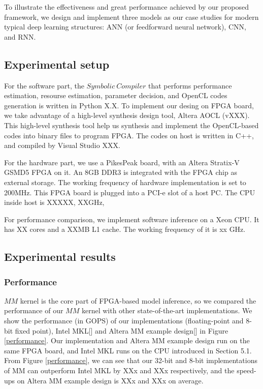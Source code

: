 \documentclass{acm_proc_article-sp-copy}
\begin{document}
To illustrate the effectiveness and great performance achieved by our proposed framework, we design and implement three models as our case studies for modern typical deep learning structures: ANN (or feedforward neural network), CNN, and RNN. 


\subsection{Experimental setup}
For the software part, the $Symbolic\ Compiler$ that performs performance estimation, resourse estimation, parameter decision, and OpenCL codes generation is written in Python X.X. To implement our desing on FPGA board, we take advantage of a high-level synthesis design tool, Altera AOCL (vXXX). This high-level synthesis tool help us synthesis and implement the OpenCL-based codes into binary files to program FPGA. The codes on host is written in C++, and compiled by Visual Studio XXX.

For the hardware part, we use a PikesPeak board, with an Altera Stratix-V GSMD5 FPGA on it. An 8GB DDR3 is integrated with the FPGA chip as external storage. The working  frequency of hardware implementation is set to 200MHz. This FPGA board is plugged into a PCI-e slot of a host PC. The CPU inside host is XXXXX, XXGHz,

For performance comparison, we implement software inference on a Xeon CPU. It has XX cores and a XXMB L1 cache. The working frequency of it is xx GHz.

\subsection{Experimental results}

\subsubsection{Performance}
$MM$ kernel is the core part of FPGA-based model inference, so we compared the performance of our $MM$ kernel with other state-of-the-art implementations. We show the performance (in GOPS) of our implementations (floating-point and 8-bit fixed point), Intel MKL[] and Altera MM example design[] in Figure \ref{performance}. Our implementation and Altera MM example design run on the same FPGA board, and Intel MKL runs on the CPU introduced in Section 5.1. From Figure \ref{performance}, we can see that our 32-bit and 8-bit implementations of MM can outperform Intel MKL by XXx and XXx respectively, and the speed-ups on Altera MM example design is XXx and XXx on average.
\end{document}

